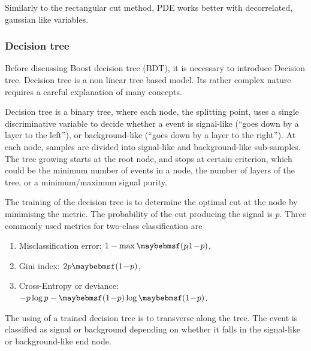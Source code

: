
Similarly to the rectangular cut method, PDE works better with decorrelated, gaussian like variables.



\subsubsection{Decision tree}
\label{sec:pandoraDecisionTree}

Before discussing Boost decision tree (BDT), it is necessary to introduce Decision tree. Decision tree is a non linear tree based model. Its rather complex nature requires a careful explanation of many concepts.

Decision tree is a binary tree, where each node, the splitting point, uses a single discriminative variable to decide whether a event is signal-like (``goes down by a layer to the left''), or background-like (``goes down by a layer to the right''). At each node, samples are divided into signal-like and background-like sub-samples. The tree growing starts at the root node, and stops at certain criterion, which could be the minimum number of events in a node, the number of layers of the tree, or a minimum/maximum signal purity.

The training of the decision tree is to determine the optimal cut at the node by minimising the metric. The probability of the cut producing the signal is $p$. Three commonly used metrics for two-class classification are
\begin{enumerate}
\item Misclassification error:  $1 - \max\parenths{p\!,\!1\!-\!p}$,
\item Gini index: $2p\parenths{1\!-\!p}$,
\item Cross-Entropy or deviance: $-p\log{p}-\parenths{1\!-\!p}\log\parenths{1\!-\!p}$.
\end{enumerate}

The using of a trained decision tree is to transverse along the tree. The event is classified as signal or background depending on whether it falls in the signal-like or background-like end node.

